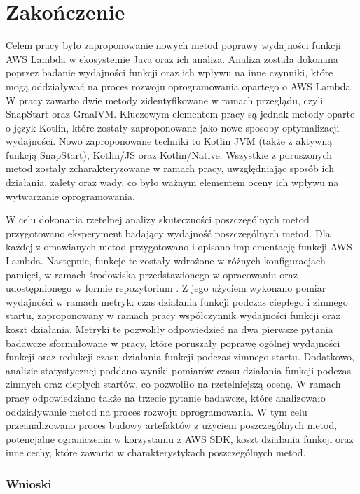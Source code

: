 \chapter*{Zakończenie}\label{chapter:zakonczenie}

Celem pracy było zaproponowanie nowych metod poprawy wydajności funkcji AWS Lambda w ekosystemie Java oraz ich analiza.
Analiza została dokonana poprzez badanie wydajności funkcji oraz ich wpływu na inne czynniki, które mogą oddziaływać na proces rozwoju oprogramowania opartego o AWS Lambda.
W pracy zawarto dwie metody zidentyfikowane w ramach przeglądu, czyli SnapStart oraz GraalVM.
Kluczowym elementem pracy są jednak metody oparte o język Kotlin, które zostały zaproponowane jako nowe sposoby optymalizacji wydajności.
Nowo zaproponowane techniki to Kotlin JVM (także z aktywną funkcją SnapStart), Kotlin/JS oraz Kotlin/Native.
Wszystkie z poruszonych metod zostały zcharakteryzowane w ramach pracy, uwzględniając sposób ich działania, zalety oraz wady, co było ważnym elementem oceny ich wpływu na wytwarzanie oprogramowania.

W celu dokonania rzetelnej analizy skuteczności poszczególnych metod przygotowano eksperyment badający wydajność poszczególnych metod.
Dla każdej z omawianych metod przygotowano i opisano implementację funkcji AWS Lambda.
Następnie, funkcje te zostały wdrożone w różnych konfiguracjach pamięci, w ramach środowiska przedstawionego w opracowaniu oraz udostępnionego w formie repozytorium \cite{RepozytoriumEksperyment}.
Z jego użyciem wykonano pomiar wydajności w ramach metryk: czas działania funkcji podczas ciepłego i zimnego startu, zaproponowany w ramach pracy współczynnik wydajności funkcji oraz koszt działania.
Metryki te pozwoliły odpowiedzieć na dwa pierwsze pytania badawcze sformułowane w pracy, które poruszały poprawę ogólnej wydajności funkcji oraz redukcji czasu działania funkcji podczas zimnego startu.
Dodatkowo, analizie statystycznej poddano wyniki pomiarów czasu działania funkcji podczas zimnych oraz ciepłych startów, co pozwoliło na rzetelniejszą ocenę.
W ramach pracy odpowiedziano także na trzecie pytanie badawcze, które analizowało oddziaływanie metod na proces rozwoju oprogramowania.
W tym celu przeanalizowano proces budowy artefaktów z użyciem poszczególnych metod, potencjalne ograniczenia w korzystaniu z AWS SDK, koszt działania funkcji oraz inne cechy, które zawarto w charakterystykach poszczególnych metod.

\subsection*{Wnioski}

